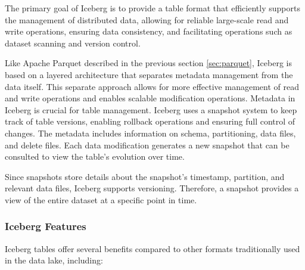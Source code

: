The primary goal of Iceberg is to provide a table format that efficiently supports the management of distributed data, allowing for reliable large-scale read and write operations, ensuring data consistency, and facilitating operations such as dataset scanning and version control.

Like Apache Parquet described in the previous section \ref{sec:parquet}, Iceberg is based on a layered architecture that separates metadata management from the data itself. This separate approach allows for more effective management of read and write operations and enables scalable modification operations. Metadata in Iceberg is crucial for table management. Iceberg uses a snapshot system to keep track of table versions, enabling rollback operations and ensuring full control of changes. The metadata includes information on schema, partitioning, data files, and delete files. Each data modification generates a new snapshot that can be consulted to view the table's evolution over time.

Since snapshots store details about the snapshot's timestamp, partition, and relevant data files, Iceberg supports versioning. Therefore, a snapshot provides a view of the entire dataset at a specific point in time.

\subsubsection{Iceberg Features}

Iceberg tables offer several benefits compared to other formats traditionally used in the data lake, including:

